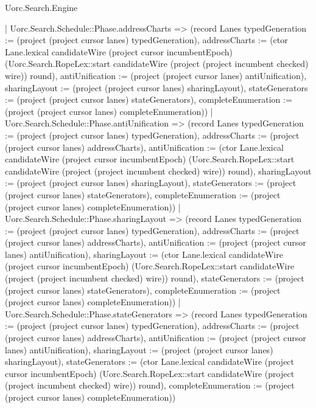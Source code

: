 \begin{lexlean}{Uorc.Search.Engine}
\begin{semanticmodule}
{{            | Uorc.Search.Schedule::Phase.addressCharts => (record Lanes {typedGeneration := (project (project cursor lanes) typedGeneration), addressCharts := (ctor Lane.lexical candidateWire (project cursor incumbentEpoch) (Uorc.Search.RopeLex::start candidateWire (project (project incumbent checked) wire)) round), antiUnification := (project (project cursor lanes) antiUnification), sharingLayout := (project (project cursor lanes) sharingLayout), stateGenerators := (project (project cursor lanes) stateGenerators), completeEnumeration := (project (project cursor lanes) completeEnumeration)})
            | Uorc.Search.Schedule::Phase.antiUnification => (record Lanes {typedGeneration := (project (project cursor lanes) typedGeneration), addressCharts := (project (project cursor lanes) addressCharts), antiUnification := (ctor Lane.lexical candidateWire (project cursor incumbentEpoch) (Uorc.Search.RopeLex::start candidateWire (project (project incumbent checked) wire)) round), sharingLayout := (project (project cursor lanes) sharingLayout), stateGenerators := (project (project cursor lanes) stateGenerators), completeEnumeration := (project (project cursor lanes) completeEnumeration)})
            | Uorc.Search.Schedule::Phase.sharingLayout => (record Lanes {typedGeneration := (project (project cursor lanes) typedGeneration), addressCharts := (project (project cursor lanes) addressCharts), antiUnification := (project (project cursor lanes) antiUnification), sharingLayout := (ctor Lane.lexical candidateWire (project cursor incumbentEpoch) (Uorc.Search.RopeLex::start candidateWire (project (project incumbent checked) wire)) round), stateGenerators := (project (project cursor lanes) stateGenerators), completeEnumeration := (project (project cursor lanes) completeEnumeration)})
            | Uorc.Search.Schedule::Phase.stateGenerators => (record Lanes {typedGeneration := (project (project cursor lanes) typedGeneration), addressCharts := (project (project cursor lanes) addressCharts), antiUnification := (project (project cursor lanes) antiUnification), sharingLayout := (project (project cursor lanes) sharingLayout), stateGenerators := (ctor Lane.lexical candidateWire (project cursor incumbentEpoch) (Uorc.Search.RopeLex::start candidateWire (project (project incumbent checked) wire)) round), completeEnumeration := (project (project cursor lanes) completeEnumeration)})
}}
\end{semanticmodule}
\end{lexlean}

